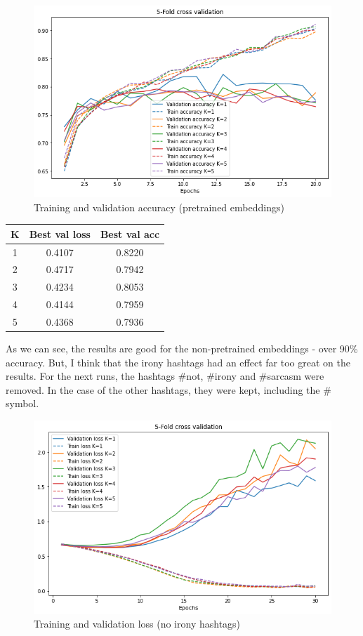 \documentclass[11pt]{article}
\begin{document}
\begin{figure}[h!]
  \includegraphics[width=\columnwidth]{train_acc_hashtags_pretrained}
  \caption{Training and validation accuracy (pretrained embeddings)}\label{fig:figure3}
\end{figure}

\begin{center}
\begin{tabular}{||c c c||}
 \hline
 K & Best val loss & Best val acc\\ [0.5ex]
 \hline\hline
 1 & 0.4107 & 0.8220 \\
 \hline
 2 & 0.4717 & 0.7942 \\
 \hline
 3 & 0.4234 & 0.8053 \\
 \hline
 4 & 0.4144 & 0.7959 \\
 \hline
 5 & 0.4368 & 0.7936 \\ [1ex]
 \hline
\end{tabular}
\end{center}

As we can see, the results are good for the non-pretrained embeddings - over 90\% accuracy.
But, I think that the irony hashtags had an effect far too great on the results.
For the next runs, the hashtags \#not, \#irony and \#sarcasm were removed.
In the case of the other hashtags, they were kept, including the \# symbol.

\begin{figure}[h!]
  \includegraphics[width=\columnwidth]{train_loss}
  \caption{Training and validation loss (no irony hashtags)}\label{fig:figure5}
\end{figure}
\end{document}
